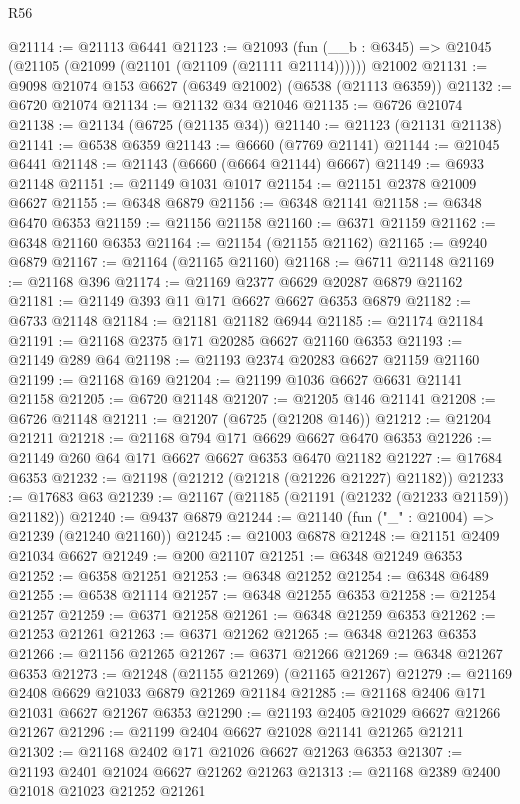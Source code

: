 \begin{lexlean}{R56}
\begin{coremodule}
@21114 := @21113 @6441
@21123 := @21093
    (fun (__b : @6345) => @21045 (@21105 (@21099 (@21101 (@21109 (@21111 @21114))))))
    @21002
@21131 := @9098 @21074 @153 @6627 (@6349 @21002) (@6538 (@21113 @6359))
@21132 := @6720 @21074
@21134 := @21132 @34 @21046
@21135 := @6726 @21074
@21138 := @21134 (@6725 (@21135 @34))
@21140 := @21123 (@21131 @21138)
@21141 := @6538 @6359
@21143 := @6660 (@7769 @21141)
@21144 := @21045 @6441
@21148 := @21143 (@6660 (@6664 @21144) @6667)
@21149 := @6933 @21148
@21151 := @21149 @1031 @1017
@21154 := @21151 @2378 @21009 @6627
@21155 := @6348 @6879
@21156 := @6348 @21141
@21158 := @6348 @6470 @6353
@21159 := @21156 @21158
@21160 := @6371 @21159
@21162 := @6348 @21160 @6353
@21164 := @21154 (@21155 @21162)
@21165 := @9240 @6879
@21167 := @21164 (@21165 @21160)
@21168 := @6711 @21148
@21169 := @21168 @396
@21174 := @21169 @2377 @6629 @20287 @6879 @21162
@21181 := @21149 @393 @11 @171 @6627 @6627 @6353 @6879
@21182 := @6733 @21148
@21184 := @21181 @21182 @6944
@21185 := @21174 @21184
@21191 := @21168 @2375 @171 @20285 @6627 @21160 @6353
@21193 := @21149 @289 @64
@21198 := @21193 @2374 @20283 @6627 @21159 @21160
@21199 := @21168 @169
@21204 := @21199 @1036 @6627 @6631 @21141 @21158
@21205 := @6720 @21148
@21207 := @21205 @146 @21141
@21208 := @6726 @21148
@21211 := @21207 (@6725 (@21208 @146))
@21212 := @21204 @21211
@21218 := @21168 @794 @171 @6629 @6627 @6470 @6353
@21226 := @21149 @260 @64 @171 @6627 @6627 @6353 @6470 @21182
@21227 := @17684 @6353
@21232 := @21198 (@21212 (@21218 (@21226 @21227) @21182))
@21233 := @17683 @63
@21239 := @21167 (@21185 (@21191 (@21232 (@21233 @21159)) @21182))
@21240 := @9437 @6879
@21244 := @21140 (fun ("_" : @21004) => @21239 (@21240 @21160))
@21245 := @21003 @6878
@21248 := @21151 @2409 @21034 @6627
@21249 := @200 @21107
@21251 := @6348 @21249 @6353
@21252 := @6358 @21251
@21253 := @6348 @21252
@21254 := @6348 @6489
@21255 := @6538 @21114
@21257 := @6348 @21255 @6353
@21258 := @21254 @21257
@21259 := @6371 @21258
@21261 := @6348 @21259 @6353
@21262 := @21253 @21261
@21263 := @6371 @21262
@21265 := @6348 @21263 @6353
@21266 := @21156 @21265
@21267 := @6371 @21266
@21269 := @6348 @21267 @6353
@21273 := @21248 (@21155 @21269) (@21165 @21267)
@21279 := @21169 @2408 @6629 @21033 @6879 @21269 @21184
@21285 := @21168 @2406 @171 @21031 @6627 @21267 @6353
@21290 := @21193 @2405 @21029 @6627 @21266 @21267
@21296 := @21199 @2404 @6627 @21028 @21141 @21265 @21211
@21302 := @21168 @2402 @171 @21026 @6627 @21263 @6353
@21307 := @21193 @2401 @21024 @6627 @21262 @21263
@21313 := @21168 @2389 @2400 @21018 @21023 @21252 @21261

\end{coremodule}
\end{lexlean}
